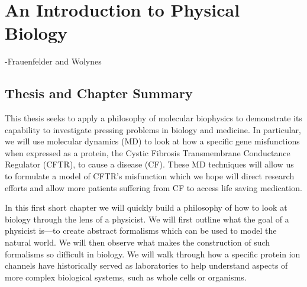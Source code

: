 \chapter{An Introduction to Physical Biology}
\setcounter{page}{1}
\label{chap:introduction}
 {-Frauenfelder and Wolynes \cite{frauenfelder1994}}
\vspace
\section{Thesis and Chapter Summary}

This thesis seeks to apply a philosophy of molecular biophysics to demonstrate its capability to investigate pressing problems in biology and medicine. In particular, we will use molecular dynamics (MD) to look at how a specific gene misfunctions when expressed as a protein, the Cystic Fibrosis Transmembrane Conductance Regulator (CFTR), to cause a disease (CF). These MD techniques will allow us to formulate a model of CFTR's misfunction which we hope will direct research efforts and allow more patients suffering from CF to access life saving medication. 

In this first short chapter we will quickly build a philosophy of how to look at biology through the lens of a physicist. We will first outline what the goal of a physicist is---to create abstract formalisms which can be used to model the natural world. We will then observe what makes the construction of such formalisms so difficult in biology. We will walk through how a specific protein ion channels have historically served as laboratories to help understand aspects of more complex biological systems, such as whole cells or organisms. 

